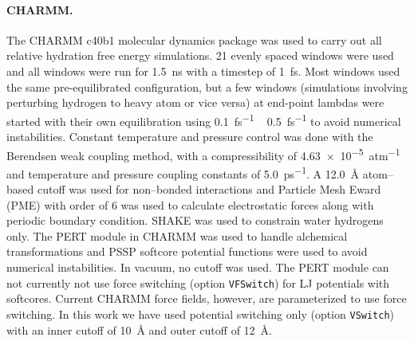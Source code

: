 \documentclass[journal=jctcce,manuscript=article]{achemso}
\newcommand{\inpopt}[1]{\texttt{#1}}
\begin{document}
\paragraph{CHARMM.} The CHARMM c40b1 molecular dynamics package was used to 
carry out all relative hydration free energy simulations.  21 evenly spaced 
windows were used and all windows were run for \SI{1.5}{ns} with a timestep of \SI{1}{fs}.  Most windows used the same pre-equilibrated configuration, but a few windows (simulations involving perturbing hydrogen to heavy atom or vice versa) at end-point lambdas were started with their own equilibration using
\SI{0.1}{fs^{-1}} ~ \SI{0.5}{fs^{-1}} to avoid numerical instabilities.
 Constant temperature and pressure control was done with the Berendsen weak coupling method, with a 
compressibility of \SI{4.63e-5}{atm^{-1}} and temperature and pressure coupling 
constants of \SI{5.0}{ps^{-1}}.  A \SI{12.0}{\angstrom} atom--based cutoff was used for non--bonded interactions and Particle Mesh Eward (PME) with order of 6 was used to calculate electrostatic forces along with periodic boundary condition.  SHAKE was used to constrain water hydrogens only.  The PERT module 
in CHARMM was used to handle alchemical transformations and PSSP 
softcore potential functions were used to avoid numerical instabilities.  In
vacuum, no cutoff was used.
%
The PERT module can not currently not use force switching (option \inpopt{VFSwitch}) for LJ potentials with softcores.  Current CHARMM force fields, however, are parameterized to use force switching. %
In this work we have used potential switching only (option \inpopt{VSwitch}) with an inner cutoff of \SI{10}{\angstrom} and outer cutoff of \SI{12}{\angstrom}.
\end{document}
